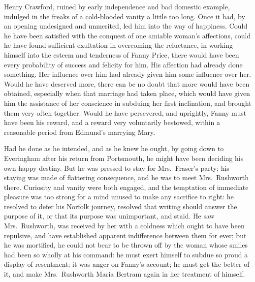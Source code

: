 \documentclass{article}
\begin{document}
Henry Crawford, ruined by early independence and bad
domestic example, indulged in the freaks of a cold-blooded
vanity a little too long.  Once it had, by an opening
undesigned and unmerited, led him into the way of happiness.
Could he have been satisfied with the conquest of one
amiable woman's affections, could he have found sufficient
exultation in overcoming the reluctance, in working himself
into the esteem and tenderness of Fanny Price, there would
have been every probability of success and felicity for him.
His affection had already done something.  Her influence
over him had already given him some influence over her.
Would he have deserved more, there can be no doubt
that more would have been obtained, especially when
that marriage had taken place, which would have given
him the assistance of her conscience in subduing her
first inclination, and brought them very often together.
Would he have persevered, and uprightly, Fanny must have
been his reward, and a reward very voluntarily bestowed,
within a reasonable period from Edmund's marrying Mary.

Had he done as he intended, and as he knew he ought,
by going down to Everingham after his return from Portsmouth,
he might have been deciding his own happy destiny.
But he was pressed to stay for Mrs.\ Fraser's party;
his staying was made of flattering consequence, and he
was to meet Mrs.\ Rushworth there.  Curiosity and vanity
were both engaged, and the temptation of immediate pleasure
was too strong for a mind unused to make any sacrifice
to right:  he resolved to defer his Norfolk journey,
resolved that writing should answer the purpose of it,
or that its purpose was unimportant, and staid.  He saw
Mrs.\ Rushworth, was received by her with a coldness which
ought to have been repulsive, and have established apparent
indifference between them for ever; but he was mortified,
he could not bear to be thrown off by the woman whose
smiles had been so wholly at his command:  he must exert
himself to subdue so proud a display of resentment; it was
anger on Fanny's account; he must get the better of it,
and make Mrs.\ Rushworth Maria Bertram again in her treatment
of himself.
\end{document}
